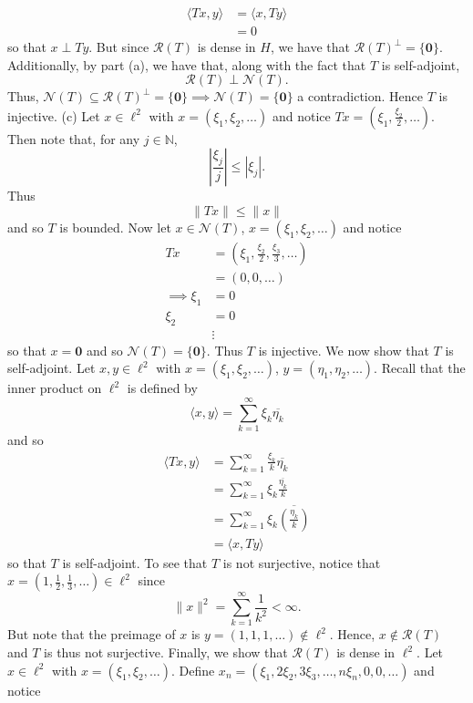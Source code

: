 \documentclass{article}
\begin{document}
\begin{itemize}
\begin{align*}
        \langle Tx, y\rangle &= \langle x, Ty \rangle\\
        &= 0
    \end{align*}
    so that $x \perp Ty$. But since $\mathcal{R}(T)$ is dense in $H$, we have that $\mathcal{R}(T)^{\perp} = \{\mathbf{0}\}$. Additionally, by part (a), we have that, along with the fact that $T$ is self-adjoint,
    \[\mathcal{R}(T) \perp \mathcal{N}(T).\]
    Thus, $\mathcal{N}(T) \subseteq \mathcal{R}(T)^{\perp} = \{\mathbf{0}\} \implies \mathcal{N}(T) = \{\mathbf{0}\}$ a contradiction. Hence $T$ is injective.
    \newline\newline
    (c) Let $x \in \ell^2$ with $x = (\xi_1, \xi_2, \dots)$ and notice $Tx = \left(\xi_1, \frac{\xi_2}{2},\dots\right)$. Then note that, for any $j \in \mathbb{N}$, 
    \[\left|\frac{\xi_j}{j}\right| \leq |\xi_j|.\]
    Thus 
    \[\|Tx\| \leq \|x\|\]
    and so $T$ is bounded. Now let $x \in \mathcal{N}(T)$, $x = (\xi_1, \xi_2, \dots)$ and notice
    \begin{align*}
        Tx &= \left(\xi_1, \frac{\xi_2}{2}, \frac{\xi_3}{3},\dots\right)\\
        &= (0,0,\dots)\\
        \implies \xi_1 &= 0\\
        \xi_2 &= 0\\
        &\vdots
    \end{align*}
    so that $x = \mathbf{0}$ and so $\mathcal{N}(T) = \{\mathbf{0}\}$. Thus $T$ is injective. We now show that $T$ is self-adjoint. Let $x, y \in \ell^2$ with $x = (\xi_1,\xi_2,\dots)$, $y = (\eta_1, \eta_2, \dots)$. Recall that the inner product on $\ell^2$ is defined by
    \[\langle x, y\rangle = \sum_{k = 1}^{\infty} \xi_k \overline{\eta_k}\]
    and so
    \begin{align*}
        \langle Tx, y\rangle &= \sum_{k = 1}^{\infty} \frac{\xi_k}{k}\overline{\eta_k}\\
        &= \sum_{k = 1}^{\infty} \xi_k\frac{\overline{\eta_k}}{k}\\
        &= \sum_{k = 1}^{\infty} \xi_k\overline{\left(\frac{\eta_k}{k}\right)}\\
        &= \langle x, Ty \rangle
    \end{align*}
    so that $T$ is self-adjoint. To see that $T$ is not surjective, notice that $x = \left(1, \frac{1}{2}, \frac{1}{3}, \dots\right) \in \ell^2$ since 
    \[\|x\|^2 = \sum_{k = 1}^{\infty} \frac{1}{k^2} < \infty.\]
    But note that the preimage of $x$ is $y = (1,1,1,\dots) \notin \ell^2$. Hence, $x \notin \mathcal{R}(T)$ and $T$ is thus not surjective. Finally, we show that $\mathcal{R}(T)$ is dense in $\ell^2$. Let $x \in \ell^2$ with $x = (\xi_1, \xi_2, \dots)$. Define $x_n = (\xi_1, 2\xi_2, 3\xi_3, \dots, n\xi_n, 0, 0,\dots)$ and notice

\end{itemize}
\end{document}
